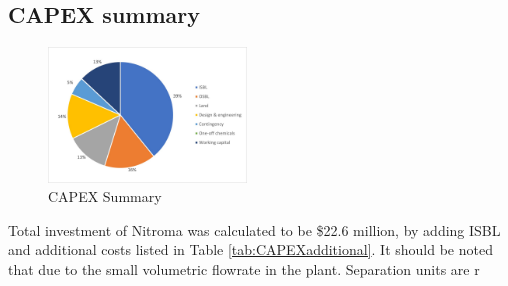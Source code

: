 \subsection{CAPEX summary}
\begin{figure}
    \vspace{-1.1cm}
    \caption{CAPEX Summary}
    \label{fig:OPEXSummary}
    \includegraphics[width=0.47\textwidth]{chapters/6-economics/figures/CAPEX_summary.jpg}
\end{figure}
Total investment of Nitroma was calculated to be \$22.6 million, by adding ISBL and additional costs listed in Table \ref{tab:CAPEXadditional}. It should be noted that due to the small volumetric flowrate in the plant. Separation units are r